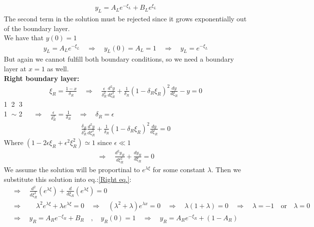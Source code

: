 \documentclass[a4paper,10pt]{article}
\begin{document}
\begin{align}
y_L = A_L e^{-\xi_L} + B_L e^{\xi_L} \nonumber
\end{align}
\vspace{2mm}
The second term in the solution must be rejected since it grows exponentially out of the boundary layer.\\
We have that $y(0) = 1$
\begin{align}
y_L = A_L e^{-\xi_L} \quad \Rightarrow \quad y_L(0) = A_L = 1 \quad \Rightarrow \quad y_L = e^{-\xi_L} \label{inner sol.}
\end{align}
\vspace{2mm}
But again we cannot fulfill both boundary conditions, so we need a boundary layer at $x = 1$ as well.\\ 
\newpage
\textbf{Right boundary layer:}\\
\begin{align}
\xi_R = \frac{1-x}{\delta_R} \quad \Rightarrow \quad \frac{\epsilon}{\delta_R^2} \frac{d^2 y}{d \xi_R^2} + \frac{1}{\delta_R}(1-\delta_R \xi_R)^2 \frac{d y}{d \xi_R} - y = 0 \nonumber
\end{align}
\hspace{7.5cm} \textcircled{1} \hspace{16mm} \textcircled{2} \hspace{15mm} \textcircled{3}\\
\vspace{4mm}
\hspace{5.6cm}\textcircled{1} $\sim$ \textcircled{2}
$\quad \Rightarrow \quad \frac{\epsilon}{\delta_R^2}=\frac{1}{\delta_R} \quad \Rightarrow \quad \delta_R = \epsilon$
\begin{align}
\frac{\delta_R}{\delta_R^2} \frac{d^2 y}{d \xi_R^2} + \frac{1}{\delta_R}(1-\delta_R \xi_R)^2 \frac{d y}{d \xi_R}=0 \nonumber
\end{align}
Where $(1 - 2 \epsilon \xi_R + \epsilon^2 \xi_R^2) \simeq 1$ since $\epsilon \ll 1$
\begin{align}
\Rightarrow \quad \frac{d^2 y_R}{d \xi_R^2} + \frac{d y_R}{d \xi_R} = 0 \label{Right eq.}
\end{align}
We assume the solution will be proportinal to $e^{\lambda \xi}$ for some constant $\lambda$. Then we substitute this solution into eq.:\ref{Right eq.}:
\begin{align}
&\Rightarrow \quad \frac{d^2}{d \xi_R^2}(e^{\lambda \xi}) + \frac{d}{d \xi_R}(e^{\lambda \xi}) = 0 \nonumber \\
&\Rightarrow \qquad \lambda^2 e^{\lambda \xi} + \lambda e^{\lambda \xi}=0 \nonumber \quad \Rightarrow \quad (\lambda^2 + \lambda)e^{\lambda x}=0 \nonumber \quad \Rightarrow \quad \lambda(1+\lambda)=0 \quad \Rightarrow \quad \lambda=-1 \quad \text{or} \quad \lambda = 0 \nonumber\\
&\Rightarrow \quad y_R = A_R e^{-\xi_R} + B_R \quad , \quad y_R(0)=1 \quad \Rightarrow \quad y_R = A_R e^{-\xi_R} + (1-A_R) \label{Right sol.}
\end{align}
\end{document}
